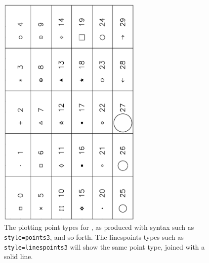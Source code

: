 \begin{figure}[tb] \begin{center}
  \includegraphics[width=2.75in,angle=-90]{figs/plot_points.ps}
  \caption{ The plotting point types for {\ifeffit}, as produced with
 syntax such as {\tt{style=points3}}, and so forth.  The linespoints
 types such as {\tt{style=linespoints3}} will show the same point type,
 joined with a solid line.}\label{Fig:PlotPoints}
\end{center} \end{figure}

